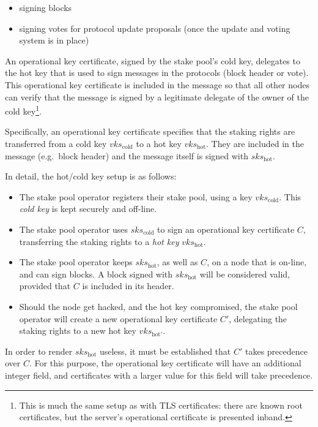 \documentclass[11pt,a4paper]{article}
\begin{document}
\begin{itemize}
\item
  signing blocks
\item signing votes for protocol update proposals (once the update and
  voting system is in place)
\end{itemize}

An operational key certificate, signed by the stake pool's cold key,
delegates to the hot key that is used to sign messages in the
protocols (block header or vote). This operational key certificate is
included in the message so that all other nodes can verify that the
message is signed by a legitimate delegate of the owner of the cold
key\footnote{This is much the same setup as with TLS certificates:
  there are known root certificates, but the server's operational
  certificate is presented inband.}.

Specifically, an operational key certificate specifies that the
staking rights are transferred from a cold key \(vks_\text{cold}\)
to a hot key \(vks_\text{hot}\).
They are included in the message (e.g.~block header) and the message
itself is signed with \(sks_\text{hot}\).

In detail, the hot/cold key setup is as follows:

\begin{itemize}
\item
  The stake pool operator registers their stake pool, using a key
  \(vks_\text{cold}\). This \emph{cold key} is kept securely and
  off-line.
\item The stake pool operator uses \(sks_\text{cold}\)
  to sign an operational key certificate \(C\),
  transferring the staking rights to a \emph{hot key}
  \(vks_\text{hot}\).
\item
  The stake pool operator keeps \(sks_\text{hot}\), as well as \(C\), on
  a node that is on-line, and can sign blocks. A block signed with
  \(sks_\text{hot}\) will be considered valid, provided that \(C\) is
  included in its header.
\item
  Should the node get hacked, and the hot key compromised, the stake
  pool operator will create a new operational key certificate
  \(C'\), delegating the staking rights to a new hot key
  \(vks_{\text{hot}'}\).
\end{itemize}

In order to render \(sks_\text{hot}\) useless, it must be established
that \(C'\) takes precedence over \(C\). For this purpose, the
operational key certificate will have an additional integer
field, and certificates with a larger value for this field will take
precedence.
\end{document}
